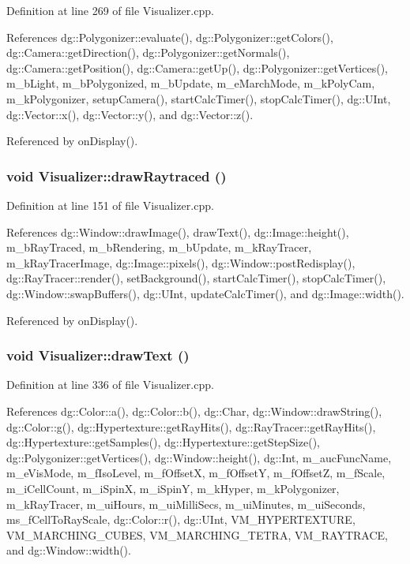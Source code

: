 Definition at line 269 of file Visualizer.cpp.

References dg::Polygonizer::evaluate(), dg::Polygonizer::get\-Colors(), dg::Camera::get\-Direction(), dg::Polygonizer::get\-Normals(), dg::Camera::get\-Position(), dg::Camera::get\-Up(), dg::Polygonizer::get\-Vertices(), m\_\-b\-Light, m\_\-b\-Polygonized, m\_\-b\-Update, m\_\-e\-March\-Mode, m\_\-k\-Poly\-Cam, m\_\-k\-Polygonizer, setup\-Camera(), start\-Calc\-Timer(), stop\-Calc\-Timer(), dg::UInt, dg::Vector::x(), dg::Vector::y(), and dg::Vector::z().

Referenced by on\-Display().
\subsubsection{\setlength{\rightskip}{0pt plus 5cm}void Visualizer::draw\-Raytraced ()}\label{classdg_1_1Visualizer_a13}




Definition at line 151 of file Visualizer.cpp.

References dg::Window::draw\-Image(), draw\-Text(), dg::Image::height(), m\_\-b\-Ray\-Traced, m\_\-b\-Rendering, m\_\-b\-Update, m\_\-k\-Ray\-Tracer, m\_\-k\-Ray\-Tracer\-Image, dg::Image::pixels(), dg::Window::post\-Redisplay(), dg::Ray\-Tracer::render(), set\-Background(), start\-Calc\-Timer(), stop\-Calc\-Timer(), dg::Window::swap\-Buffers(), dg::UInt, update\-Calc\-Timer(), and dg::Image::width().

Referenced by on\-Display().
\subsubsection{\setlength{\rightskip}{0pt plus 5cm}void Visualizer::draw\-Text ()}\label{classdg_1_1Visualizer_a11}




Definition at line 336 of file Visualizer.cpp.

References dg::Color::a(), dg::Color::b(), dg::Char, dg::Window::draw\-String(), dg::Color::g(), dg::Hypertexture::get\-Ray\-Hits(), dg::Ray\-Tracer::get\-Ray\-Hits(), dg::Hypertexture::get\-Samples(), dg::Hypertexture::get\-Step\-Size(), dg::Polygonizer::get\-Vertices(), dg::Window::height(), dg::Int, m\_\-auc\-Func\-Name, m\_\-e\-Vis\-Mode, m\_\-f\-Iso\-Level, m\_\-f\-Offset\-X, m\_\-f\-Offset\-Y, m\_\-f\-Offset\-Z, m\_\-f\-Scale, m\_\-i\-Cell\-Count, m\_\-i\-Spin\-X, m\_\-i\-Spin\-Y, m\_\-k\-Hyper, m\_\-k\-Polygonizer, m\_\-k\-Ray\-Tracer, m\_\-ui\-Hours, m\_\-ui\-Milli\-Secs, m\_\-ui\-Minutes, m\_\-ui\-Seconds, ms\_\-f\-Cell\-To\-Ray\-Scale, dg::Color::r(), dg::UInt, VM\_\-HYPERTEXTURE, VM\_\-MARCHING\_\-CUBES, VM\_\-MARCHING\_\-TETRA, VM\_\-RAYTRACE, and dg::Window::width().

